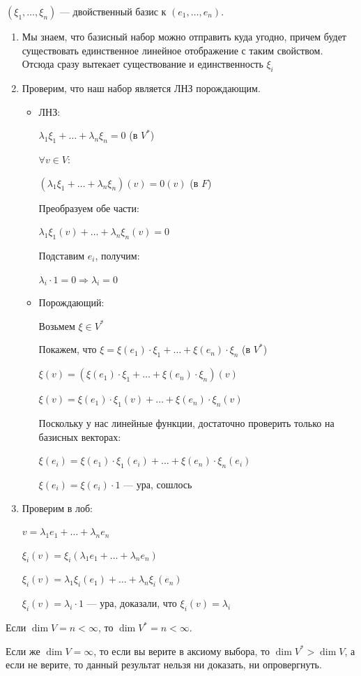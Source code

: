 \begin{defn}{}{}
    \( (\xi_1, \ldots, \xi_n) \) --- двойственный базис к \( (e_1, \ldots, e_n) \).
\end{defn}

\begin{enumerate}
    \item
        Мы знаем, что базисный набор можно отправить куда угодно,
        причем будет существовать единственное линейное отображение с таким свойством.
        Отсюда сразу вытекает существование и единственность \( \xi_i \)
    \item
        Проверим, что наш набор является ЛНЗ порождающим.

        \begin{itemize}
            \item
                ЛНЗ:

                \( \lambda_1 \xi_1 + \ldots + \lambda_n \xi_n = 0 \) (в \( V^* \))

                \( \forall v \in V \):

                \( (\lambda_1 \xi_1 + \ldots + \lambda_n \xi_n)(v) = 0(v) \) (в \( F \))

                Преобразуем обе части:

                \( \lambda_1 \xi_1 (v) + \ldots + \lambda_n \xi_n(v) = 0 \)

                Подставим \( e_i \), получим:

                \( \lambda_i \cdot 1 = 0 \Rightarrow \lambda_i = 0 \)
            \item
                Порождающий:

                Возьмем \( \xi \in V^* \)

                Покажем, что \( \xi = \xi (e_1) \cdot \xi_1 + \ldots + \xi (e_n) \cdot \xi_n \) (в \( V^* \))

                \( \xi(v) = (\xi (e_1) \cdot \xi_1 + \ldots + \xi (e_n) \cdot \xi_n)(v) \)

                \( \xi(v) = \xi (e_1) \cdot \xi_1 (v) + \ldots + \xi (e_n) \cdot \xi_n (v) \)

                Поскольку у нас линейные функции, достаточно проверить только на базисных векторах:

                \( \xi(e_i) = \xi (e_1) \cdot \xi_1 (e_i) + \ldots + \xi (e_n) \cdot \xi_n (e_i) \)

                \( \xi(e_i) = \xi (e_i) \cdot 1 \) --- ура, сошлось
        \end{itemize}
    \item
        Проверим в лоб:

        \( v = \lambda_1 e_1 + \ldots + \lambda_n e_n \)

        \( \xi_i (v) = \xi_i(\lambda_1 e_1 + \ldots + \lambda_n e_n) \)

        \( \xi_i (v) = \lambda_1 \xi_i (e_1) + \ldots + \lambda_n \xi_ i(e_n) \)

        \( \xi_i (v) = \lambda_i \cdot 1 \) --- ура, доказали, что \( \xi_i (v) = \lambda_i \)
\end{enumerate}

\begin{coroll}{}{}
    Если \( \dim V = n < \infty \),
    то \( \dim V^* = n < \infty \).

    Если же \( \dim V = \infty \),
    то если вы верите в аксиому выбора, то \( \dim V^* > \dim V \),
    а если не верите, то данный результат нельзя ни доказать, ни опровергнуть.
\end{coroll}
